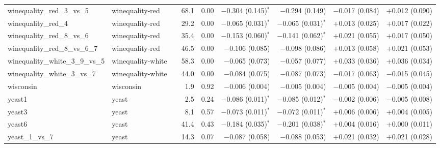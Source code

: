 \begin{table}[!htbp]
\begin{tabular}{lllrrrrrr}
winequality\_red\_3\_vs\_5 & winequality-red &  & 68.1 & 0.00 & $-$0.304 (0.145)$^{*}$ & $-$0.294 (0.149) & $-$0.017 (0.084) & +0.012 (0.090) \\
winequality\_red\_4 & winequality-red &  & 29.2 & 0.00 & $-$0.065 (0.031)$^{*}$ & $-$0.065 (0.031)$^{*}$ & +0.013 (0.025) & +0.017 (0.022) \\
winequality\_red\_8\_vs\_6 & winequality-red &  & 35.4 & 0.00 & $-$0.153 (0.060)$^{*}$ & $-$0.141 (0.062)$^{*}$ & +0.021 (0.055) & +0.017 (0.050) \\
winequality\_red\_8\_vs\_6\_7 & winequality-red &  & 46.5 & 0.00 & $-$0.106 (0.085) & $-$0.098 (0.086) & +0.013 (0.058) & +0.021 (0.053) \\
winequality\_white\_3\_9\_vs\_5 & winequality-white &  & 58.3 & 0.00 & $-$0.065 (0.073) & $-$0.057 (0.077) & +0.033 (0.036) & +0.036 (0.034) \\
winequality\_white\_3\_vs\_7 & winequality-white &  & 44.0 & 0.00 & $-$0.084 (0.075) & $-$0.087 (0.073) & $-$0.017 (0.063) & $-$0.015 (0.045) \\
wisconsin & wisconsin &  & 1.9 & 0.92 & $-$0.006 (0.004) & $-$0.005 (0.004) & $-$0.005 (0.004) & $-$0.005 (0.004) \\
yeast1 & yeast &  & 2.5 & 0.24 & $-$0.086 (0.011)$^{*}$ & $-$0.085 (0.012)$^{*}$ & $-$0.002 (0.006) & $-$0.005 (0.008) \\
yeast3 & yeast &  & 8.1 & 0.57 & $-$0.073 (0.011)$^{*}$ & $-$0.072 (0.011)$^{*}$ & +0.006 (0.006) & +0.004 (0.005) \\
yeast6 & yeast &  & 41.4 & 0.43 & $-$0.184 (0.035)$^{*}$ & $-$0.201 (0.038)$^{*}$ & +0.004 (0.016) & +0.000 (0.011) \\
yeast\_1\_vs\_7 & yeast &  & 14.3 & 0.07 & $-$0.087 (0.058) & $-$0.088 (0.053) & +0.021 (0.032) & +0.021 (0.028) \\
\bottomrule
\end{tabular}
\end{table}
